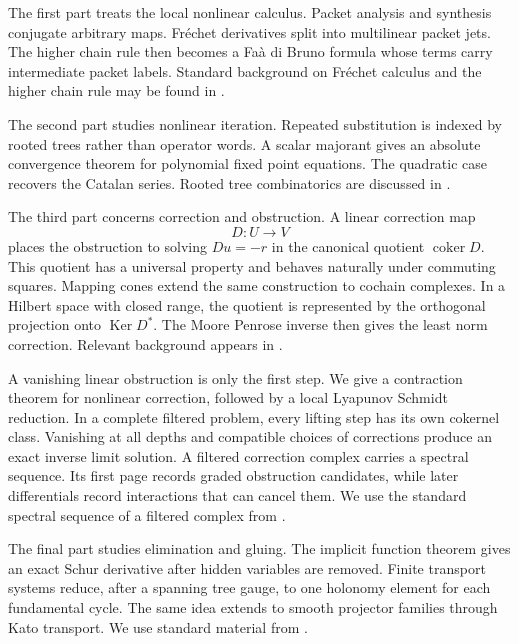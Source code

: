\documentclass{aomart}
\theoremstyle{definition}
\theoremstyle{remark}
\newcommand{\Ker}{\operatorname{Ker}}
\newcommand{\coker}{\operatorname{coker}}
\begin{document}
The first part treats the local nonlinear calculus.  Packet analysis and synthesis conjugate arbitrary maps.  Fr\'echet derivatives split into multilinear packet jets.  The higher chain rule then becomes a Fa\`a di Bruno formula whose terms carry intermediate packet labels.  Standard background on Fr\'echet calculus and the higher chain rule may be found in \cite{AbrahamMarsdenRatiu1988,ConstantineSavits1996,Deimling1985}.

The second part studies nonlinear iteration.  Repeated substitution is indexed by rooted trees rather than operator words.  A scalar majorant gives an absolute convergence theorem for polynomial fixed point equations.  The quadratic case recovers the Catalan series.  Rooted tree combinatorics are discussed in \cite{Stanley2012,LodayVallette2012,HairerLubichWanner2006}.

The third part concerns correction and obstruction.  A linear correction map
\[
D:U\longrightarrow V
\]
places the obstruction to solving $Du=-r$ in the canonical quotient $\coker D$.  This quotient has a universal property and behaves naturally under commuting squares.  Mapping cones extend the same construction to cochain complexes.  In a Hilbert space with closed range, the quotient is represented by the orthogonal projection onto $\Ker D^*$.  The Moore Penrose inverse then gives the least norm correction.  Relevant background appears in \cite{Weibel1994,Penrose1955}.

A vanishing linear obstruction is only the first step.  We give a contraction theorem for nonlinear correction, followed by a local Lyapunov Schmidt reduction.  In a complete filtered problem, every lifting step has its own cokernel class.  Vanishing at all depths and compatible choices of corrections produce an exact inverse limit solution.  A filtered correction complex carries a spectral sequence.  Its first page records graded obstruction candidates, while later differentials record interactions that can cancel them.  We use the standard spectral sequence of a filtered complex from \cite{Weibel1994,McCleary2001}.

The final part studies elimination and gluing.  The implicit function theorem gives an exact Schur derivative after hidden variables are removed.  Finite transport systems reduce, after a spanning tree gauge, to one holonomy element for each fundamental cycle.  The same idea extends to smooth projector families through Kato transport.  We use standard material from \cite{Deimling1985,GrossTucker1987,Kato1950,Kato1995,KobayashiNomizu1963}.
\end{document}
